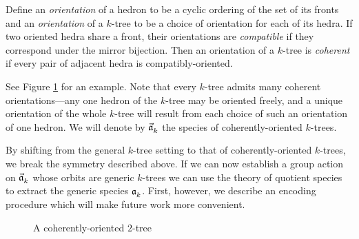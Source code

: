 \documentclass[distribution,draft]{brandiss} %
\numberwithin{section}{chapter}
\numberwithin{figure}{chapter}
\begin{document}
\begin{definition}
  \label{def:coktree}
  Define an \emph{orientation} of a hedron to be a cyclic ordering of the set of its fronts and an \emph{orientation} of a $k$-tree to be a choice of orientation for each of its hedra.
  If two oriented hedra share a front, their orientations are \emph{compatible} if they correspond under the mirror bijection.
  Then an orientation of a $k$-tree is \emph{coherent} if every pair of adjacent hedra is compatibly-oriented.
\end{definition}
See Figure \ref{fig:exco2tree} for an example.
Note that every $k$-tree admits many coherent orientations---any one hedron of the $k$-tree may be oriented freely, and a unique orientation of the whole $k$-tree will result from each choice of such an orientation of one hedron.
We will denote by $\vec{\mathfrak{a}}_{k}^{}$ the species of coherently-oriented $k$-trees.

By shifting from the general $k$-tree setting to that of coherently-oriented $k$-trees, we break the symmetry described above.
If we can now establish a group action on $\vec{\mathfrak{a}}_{k}^{}$ whose orbits are generic $k$-trees we can use the theory of quotient species to extract the generic species $\mathfrak{a}_{k}^{}$.
First, however, we describe an encoding procedure which will make future work more convenient.

\begin{figure}[htb]
  \centering
  \caption{A coherently-oriented $2$-tree}
  \label{fig:exco2tree}
\end{figure}
\end{document}
